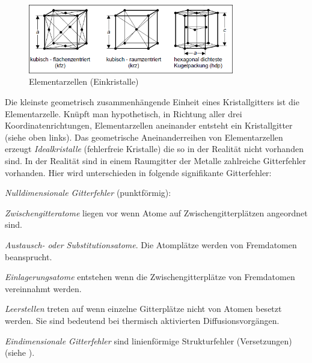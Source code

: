 \documentclass[12pt,a4paper,parskip]{scrartcl}
\begin{document}
{\begin{itemize*}
\end{itemize*}
\begin{figure}
\centering
\includegraphics[width=0.8\textwidth]{elementarzellen}
\caption[Elementarzellen]{Elementarzellen (Einkristalle)\protect\footnotemark}
\label{fig:elementarzellen}
\end{figure}




Die kleinste geometrisch zusammenhängende Einheit eines Kristallgitters ist die Elementarzelle. Knüpft man hypothetisch, in Richtung aller drei Koordinatenrichtungen, Elementarzellen aneinander entsteht ein Kristallgitter (siehe  oben links). Das geometrische Aneinanderreihen von Elementarzellen erzeugt \emph{Idealkristalle} (fehlerfreie Kristalle) die so in der Realität nicht vorhanden sind. In der Realität sind in einem Raumgitter der Metalle zahlreiche Gitterfehler vorhanden. Hier wird unterschieden in folgende signifikante Gitterfehler:
\begin{enumerate*}
\item  \emph{Nulldimensionale Gitterfehler} (punktförmig):
\begin{itemize*}
\item \emph{Zwischengitteratome} liegen vor wenn Atome auf Zwischengitterplätzen angeordnet sind. 
\item \emph{Austausch- oder Substitutionsatome}. Die Atomplätze werden von Fremdatomen beansprucht.
\item \emph{Einlagerungsatome} entstehen wenn die Zwischengitterplätze von Fremdatomen vereinnahmt werden.
\item \emph{Leerstellen} treten auf  wenn einzelne Gitterplätze nicht von Atomen besetzt werden. Sie sind bedeutend bei thermisch aktivierten Diffusionsvorgängen.
\end{itemize*}
\item \emph{Eindimensionale Gitterfehler} sind linienförmige Strukturfehler (Versetzungen)(siehe ).


\end{enumerate*}}
\end{document}

